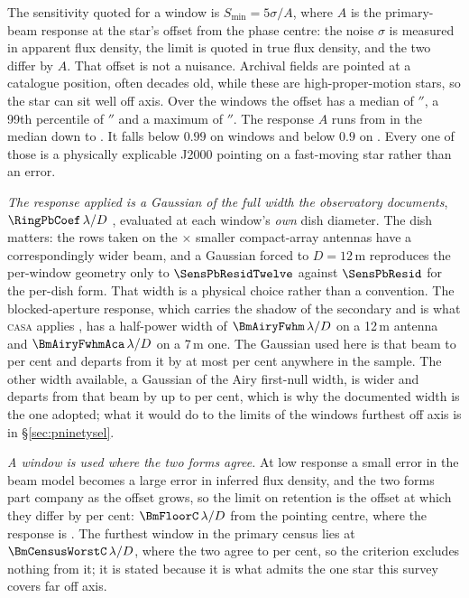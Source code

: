 The sensitivity quoted for a window is $S_{\min}=5\sigma/A$, where $A$ is the
primary-beam response at the star's offset from the phase centre: the noise
$\sigma$ is measured in apparent flux density, the limit is quoted in true flux density, and
the two differ by $A$. That offset is not a nuisance. Archival fields are
pointed at a catalogue position, often decades old, while these are
high-proper-motion stars, so the star can sit well off axis. Over the
\PbNWin{} windows the offset has a median of \PbOffMed$''$, a 99th
percentile of \PbOffPNN$''$ and a maximum of \BmOffMax$''$. The response $A$
runs from \BmRespMed{} in the median down to \BmRespMin. It falls below $0.99$
on \PbNLowNN{} windows and below $0.9$ on \BmNBelowNine. Every one
of those is a physically explicable J2000 pointing on a
fast-moving star rather than an error.

\emph{The response applied is a Gaussian of the full width the observatory
documents}, $\RingPbCoef\,\lambda/D$ \citep{ALMAHandbook}, evaluated at each
window's \emph{own} dish diameter. The dish matters: the \PbNAcaRow{} rows
taken on the \PbAcaRatio$\times$ smaller compact-array antennas have a
correspondingly wider beam, and a Gaussian forced to $D=12$\,m reproduces the
per-window geometry only to $\SensPbResidTwelve$ against $\SensPbResid$ for
the per-dish form. That width is a physical choice rather than a convention.
The blocked-aperture response, which carries the shadow of the secondary and
is what \textsc{casa} applies \citep{CASA2022}, has a half-power
width of $\BmAiryFwhm\,\lambda/D$ on a 12\,m antenna and
$\BmAiryFwhmAca\,\lambda/D$ on a 7\,m one. The Gaussian used here is that
beam to \BmDocAiryPct{} per cent and departs from it by at most
\BmModelMaxPct{} per cent anywhere in the sample. The other width available,
a Gaussian of the Airy first-null width, is wider and departs from that beam
by up to \BmModelMaxNullPct{} per cent, which is why the documented width is
the one adopted; what it would do to the limits of the windows furthest off
axis is in \S\ref{sec:pninetysel}.

\emph{A window is used where the two forms agree.} At low response a small
error in the beam model becomes a large error in inferred flux density, and the two
forms part company as the offset grows, so the limit on retention is the
offset at which they differ by \BmFloorTolPct{} per cent:
$\BmFloorC\,\lambda/D$ from the pointing centre, where the response is
\BmFloorResp. The furthest window in the primary census lies at
$\BmCensusWorstC\,\lambda/D$, where the two agree to \BmCensusWorstPct{} per
cent, so the criterion excludes nothing from it; it is stated because it is
what admits the one star this survey covers far off axis.

